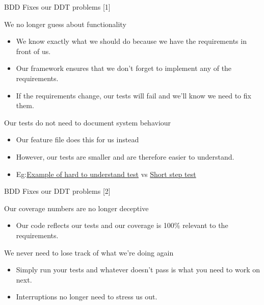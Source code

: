 \documentclass[bigger]{beamer}
\begin{document}
\begin{frame}[label={sec:org8c2ce11}]{BDD Fixes our DDT problems [1]}
\begin{block}{We \alert{no longer} guess about functionality}
\begin{itemize}
\item We know exactly what we should do because we have the requirements in front of us.
\item Our framework ensures that we don't forget to implement any of the requirements.
\item If the requirements change, our tests will fail and we'll know we need to fix them.
\end{itemize}
\end{block}
\begin{block}{Our tests \alert{do not need to} document system behaviour}
\begin{itemize}
\item Our feature file does this for us instead
\item However, our tests are smaller and are therefore easier to understand.
\item Eg:\href{file:///Users/rogergordon/ownCloud/Documents/Career/Design\_Development/Clients/Tangent\_Solutions/Vumatel/orderfulfilmentservice/orders/ae/tests/test\_order.py}{Example of hard to understand test} vs \href{possible\_solution/tests.py}{Short step test}
\end{itemize}
\end{block}
\end{frame}
\begin{frame}[label={sec:org9346031}]{BDD Fixes our DDT problems [2]}
\begin{block}{Our coverage numbers are \alert{no longer} deceptive}
\begin{itemize}
\item Our code reflects our tests and our coverage is 100\% relevant to the requirements.
\end{itemize}
\end{block}
\begin{block}{We \alert{never need to} lose track of what we're doing \alert{again}}
\begin{itemize}
\item Simply run your tests and whatever doesn't pass is what you need to work on next.
\item Interruptions no longer need to stress us out.
\end{itemize}
\end{block}
\end{frame}
\end{document}
